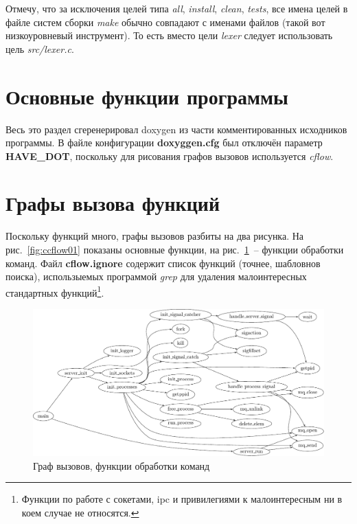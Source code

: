 \documentclass[a4paper,12pt]{report}
\begin{document}
Отмечу, что за исключения целей типа \textit{all}, \textit{install}, \textit{clean}, \textit{tests}, все имена целей в файле систем сборки \textit{make} обычно совпадают с именами файлов (такой вот низкоуровневый инструмент). То есть вместо цели \textit{lexer} следует использовать цель \textit{src/lexer.c}.

\section{Основные функции программы}

Весь это раздел сгеренерировал doxygen из части комментированных исходников программы. В файле конфигурации \textbf{doxyggen.cfg} был отключён параметр \textbf{HAVE\_DOT}, поскольку для рисования графов вызовов используется \textit{cflow}.

% 

% 
% 
% 
% 
% 
% 
% 
% 
% 
% 


\section{Графы вызова функций}

Поскольку функций много, графы вызовов разбиты на два рисунка. На рис.~\ref{fig:ccflow01} показаны основные функции, на рис.~\ref{fig:scflow01}~-- функции обработки команд. Файл \textbf{cflow.ignore} содержит список функций (точнее, шабловнов поиска), использыемых программой \textit{grep} для удаления малоинтересных стандартных функций\footnote{Функции по работе с сокетами, ipc и привилегиями к малоинтересным ни в коем случае не относятся.}.

\begin{figure}
\centering
\includegraphics[width=\textwidth]{include/scflow01_dot.pdf}
\caption{Граф вызовов, функции обработки команд}
\label{fig:scflow01}
\end{figure}
\end{document}

